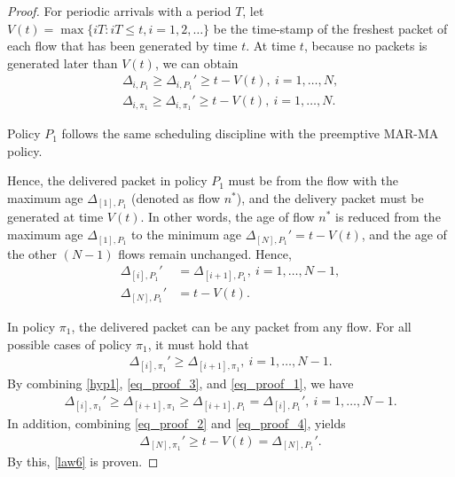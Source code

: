 {\begin{proof}


For periodic arrivals with a period $T$, let $V(t) = \max\{iT: iT \leq t,i=1,2,\ldots\}$ 
be the time-stamp of the freshest packet of each flow that has been generated by time $t$. At time $t$, because no packets is generated later than $V(t)$, we can obtain
\begin{align}%
\Delta_{i,P_1} \geq\Delta_{i,P_1}' \geq t-V(t),~i=1,\ldots,N,\nonumber\\
\Delta_{i,\pi_1} \geq\Delta_{i,\pi_1}' \geq t-V(t),~i=1,\ldots,N.\label{eq_proof_2}
\end{align} 

Policy $P_1$ follows the same scheduling discipline with the preemptive MAR-MA policy. 


Hence, the delivered packet in policy $P_1$ must be from the flow with the maximum age $\Delta_{[1],P_1}$ (denoted as flow $n^*$), and the delivery packet must be generated at time $V(t)$. In other words, the age of flow $n^*$ is reduced from the maximum age $\Delta_{[1],P_1}$ to the minimum age $\Delta_{[N],P_1}'=t-V(t)$, and the age of the other $(N-1)$ flows remain unchanged. Hence, 
\begin{align}\label{eq_proof_3}
\Delta_{[i],P_1}' &= \Delta_{[i+1],P_1},~i=1,\ldots,N-1,\\
\Delta_{[N],P_1}' &= t - V(t). \label{eq_proof_4}
\end{align}

In policy $\pi_1$, the delivered packet can be any packet from any flow. For all possible cases of policy $\pi_1$, it must hold that 
\begin{align}\label{eq_proof_1}
\Delta_{[i],\pi_1}' \geq \Delta_{[i+1],\pi_1},~i=1,\ldots,N-1. 
\end{align}
By combining \eqref{hyp1}, \eqref{eq_proof_3}, and \eqref{eq_proof_1}, we have
\begin{align}
\Delta_{[i],\pi_1}' \geq \Delta_{[i+1],\pi_1} \geq \Delta_{[i+1],P_1} = \Delta_{[i],P_1}',~i=1,\ldots,N-1.\nonumber
\end{align}
In addition, combining \eqref{eq_proof_2} and \eqref{eq_proof_4}, yields
\begin{align}
\Delta_{[N],\pi_1}' \geq  t-V(t) = \Delta_{[N],P_1}'.\nonumber
\end{align}
By this, \eqref{law6} is proven.
\end{proof}
}



